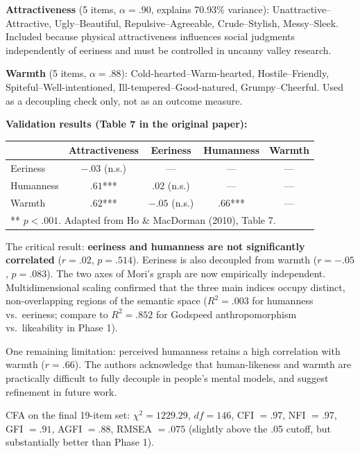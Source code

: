 \documentclass[11pt, a4paper]{article}
\begin{document}
\textbf{Attractiveness} (5 items, $\alpha = .90$, explains 70.93\% variance): Unattractive--Attractive, Ugly--Beautiful, Repulsive--Agreeable, Crude--Stylish, Messy--Sleek. Included because physical attractiveness influences social judgments independently of eeriness and must be controlled in uncanny valley research.

\textbf{Warmth} (5 items, $\alpha = .88$): Cold-hearted--Warm-hearted, Hostile--Friendly, Spiteful--Well-intentioned, Ill-tempered--Good-natured, Grumpy--Cheerful. Used as a decoupling check only, not as an outcome measure.

\textbf{Validation results (Table 7 in the original paper):}

\begin{center}
\begin{tabular}{lcccc}
\toprule
 & Attractiveness & Eeriness & Humanness & Warmth \\
\midrule
Eeriness & $-.03$ (n.s.) & --- & --- & --- \\
Humanness & $.61$*** & $.02$ (n.s.) & --- & --- \\
Warmth & $.62$*** & $-.05$ (n.s.) & $.66$*** & --- \\
\bottomrule
\multicolumn{5}{l}{\small *** $p < .001$. Adapted from Ho \& MacDorman (2010), Table 7.}
\end{tabular}
\end{center}

The critical result: \textbf{eeriness and humanness are not significantly correlated} ($r = .02$, $p = .514$). Eeriness is also decoupled from warmth ($r = -.05$, $p = .083$). The two axes of Mori's graph are now empirically independent. Multidimensional scaling confirmed that the three main indices occupy distinct, non-overlapping regions of the semantic space ($R^2 = .003$ for humanness vs.\ eeriness; compare to $R^2 = .852$ for Godspeed anthropomorphism vs.\ likeability in Phase 1).

One remaining limitation: perceived humanness retains a high correlation with warmth ($r = .66$). The authors acknowledge that human-likeness and warmth are practically difficult to fully decouple in people's mental models, and suggest refinement in future work.

CFA on the final 19-item set: $\chi^2 = 1229.29$, $df = 146$, CFI $= .97$, NFI $= .97$, GFI $= .91$, AGFI $= .88$, RMSEA $= .075$ (slightly above the .05 cutoff, but substantially better than Phase 1).
\end{document}
